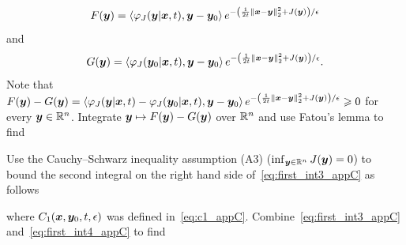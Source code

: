 \[
F(\boldsymbol{y}) = \left\langle \varphi_J(\boldsymbol{y}|\boldsymbol{x},t),\boldsymbol{y}-\boldsymbol{y}_0 \right\rangle e^{-\left(\frac{1}{2t}\left\Vert \boldsymbol{x}-\boldsymbol{y}\right\Vert _{2}^{2} + J(\boldsymbol{y})\right)/\epsilon}
\]
and
\[
G(\boldsymbol{y}) = \left\langle \varphi_J(\boldsymbol{y}_0|\boldsymbol{x},t),\boldsymbol{y}-\boldsymbol{y}_0 \right\rangle e^{-\left(\frac{1}{2t}\left\Vert \boldsymbol{x}-\boldsymbol{y}\right\Vert _{2}^{2} + J(\boldsymbol{y})\right)/\epsilon}.
\]
Note that $F(\boldsymbol{y})-G(\boldsymbol{y}) = \left\langle \varphi_J(\boldsymbol{y}|\boldsymbol{x},t) - \varphi_J(\boldsymbol{y}_0|\boldsymbol{x},t),\boldsymbol{y}-\boldsymbol{y}_0 \right\rangle e^{-\left(\frac{1}{2t}\left\Vert \boldsymbol{x}-\boldsymbol{y}\right\Vert _{2}^{2} + J(\boldsymbol{y})\right)/\epsilon} \geqslant 0$ for every $\boldsymbol{y} \in \mathbb{R}^n$. Integrate $\boldsymbol{y} \mapsto F(\boldsymbol{y})-G(\boldsymbol{y})$ over $\mathbb{R}^n$ and use Fatou's lemma to find
\beq\label{eq:first_int3_appC}
\eeq
Use the Cauchy--Schwarz inequality assumption (A3) ($\inf_{\boldsymbol{y}\in\mathbb{R}^n} J(\boldsymbol{y}) = 0$) to bound the second integral on the right hand side of~\eqref{eq:first_int3_appC} as follows
\beq\label{eq:first_int4_appC}
\eeq
where $C_1(\boldsymbol{x},\boldsymbol{y}_0,t,\epsilon)$ was defined in~\eqref{eq:c1_appC}. Combine~\eqref{eq:first_int3_appC} and~\eqref{eq:first_int4_appC} to find
\beq\label{eq:first_int5_appC}
